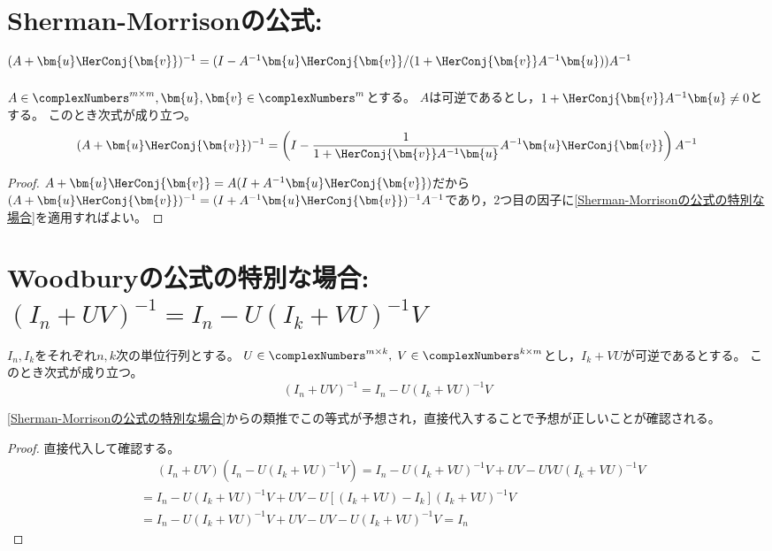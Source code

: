     \section{Sherman-Morrisonの公式\texorpdfstring{: $(A+\bm{u}\HerConj{\bm{v}})^{-1} = (I-A^{-1}\bm{u}\HerConj{\bm{v}}/(1+\HerConj{\bm{v}}A^{-1}\bm{u}))A^{-1}$}{}}
        \begin{shadebox}
            $A \in \complexNumbers^{m\times m}, \bm{u},\bm{v} \in \complexNumbers^m$とする。
            $A$は可逆であるとし，$1+\HerConj{\bm{v}}A^{-1}\bm{u} \neq 0$とする。
            このとき次式が成り立つ。
            \[ (A+\bm{u}\HerConj{\bm{v}})^{-1} = \left( I - \frac{1}{1+\HerConj{\bm{v}}A^{-1}\bm{u}}A^{-1}\bm{u}\HerConj{\bm{v}} \right)A^{-1} \]
        \end{shadebox}
        \begin{proof}
            \quad\par
            $A+\bm{u}\HerConj{\bm{v}} = A(I + A^{-1}\bm{u}\HerConj{\bm{v}})$だから$(A+\bm{u}\HerConj{\bm{v}})^{-1} = (I + A^{-1}\bm{u}\HerConj{\bm{v}})^{-1}A^{-1}$であり，2つ目の因子に\ref{Sherman-Morrisonの公式の特別な場合}を適用すればよい。
        \end{proof}
    \section{Woodburyの公式の特別な場合\texorpdfstring{: $(I_n+UV)^{-1} = I_n-U(I_k+VU)^{-1}V$}{}}
        \label{Woodburyの公式の特別な場合}
        \begin{shadebox}
            $I_n, I_k$をそれぞれ$n,k$次の単位行列とする。
            $U\in\complexNumbers^{m\times k},\; V\in\complexNumbers^{k\times m}$とし，$I_k+VU$が可逆であるとする。
            このとき次式が成り立つ。
            \[ (I_n+UV)^{-1} = I_n-U(I_k+VU)^{-1}V \]
        \end{shadebox}
        \ref{Sherman-Morrisonの公式の特別な場合}からの類推でこの等式が予想され，直接代入することで予想が正しいことが確認される。
        \begin{proof}
            \quad\par
            直接代入して確認する。
            \begin{align*}
                &\phantom{=} (I_n+UV)(I_n-U(I_k+VU)^{-1}V) = I_n - U(I_k+VU)^{-1}V + UV - UVU(I_k+VU)^{-1}V \\
                &= I_n - U(I_k+VU)^{-1}V + UV - U[(I_k + VU) - I_k](I_k+VU)^{-1}V \\
                &= I_n - U(I_k+VU)^{-1}V + UV - UV - U(I_k+VU)^{-1}V = I_n
            \end{align*}
        \end{proof}
